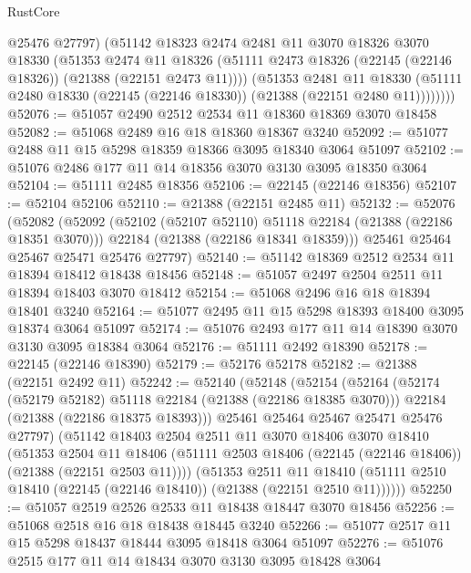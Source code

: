 \begin{lexlean}{RustCore}
\begin{coremodule}
            @25476
            @27797)
          (@51142
            @18323
            @2474
            @2481
            @11
            @3070
            @18326
            @3070
            @18330
            (@51353
              @2474
              @11
              @18326
              (@51111 @2473 @18326 (@22145 (@22146 @18326)) (@21388 (@22151 @2473 @11))))
            (@51353
              @2481
              @11
              @18330
              (@51111 @2480 @18330 (@22145 (@22146 @18330)) (@21388 (@22151 @2480 @11))))))))
@52076 := @51057 @2490 @2512 @2534 @11 @18360 @18369 @3070 @18458
@52082 := @51068 @2489 @16 @18 @18360 @18367 @3240
@52092 := @51077 @2488 @11 @15 @5298 @18359 @18366 @3095 @18340 @3064 @51097
@52102 := @51076 @2486 @177 @11 @14 @18356 @3070 @3130 @3095 @18350 @3064
@52104 := @51111 @2485 @18356
@52106 := @22145 (@22146 @18356)
@52107 := @52104 @52106
@52110 := @21388 (@22151 @2485 @11)
@52132 := @52076
    (@52082
      (@52092
        (@52102 (@52107 @52110) @51118 @22184 (@21388 (@22186 @18351 @3070)))
        @22184
        (@21388 (@22186 @18341 @18359)))
      @25461
      @25464
      @25467
      @25471
      @25476
      @27797)
@52140 := @51142 @18369 @2512 @2534 @11 @18394 @18412 @18438 @18456
@52148 := @51057 @2497 @2504 @2511 @11 @18394 @18403 @3070 @18412
@52154 := @51068 @2496 @16 @18 @18394 @18401 @3240
@52164 := @51077 @2495 @11 @15 @5298 @18393 @18400 @3095 @18374 @3064 @51097
@52174 := @51076 @2493 @177 @11 @14 @18390 @3070 @3130 @3095 @18384 @3064
@52176 := @51111 @2492 @18390
@52178 := @22145 (@22146 @18390)
@52179 := @52176 @52178
@52182 := @21388 (@22151 @2492 @11)
@52242 := @52140
    (@52148
      (@52154
        (@52164
          (@52174 (@52179 @52182) @51118 @22184 (@21388 (@22186 @18385 @3070)))
          @22184
          (@21388 (@22186 @18375 @18393)))
        @25461
        @25464
        @25467
        @25471
        @25476
        @27797)
      (@51142
        @18403
        @2504
        @2511
        @11
        @3070
        @18406
        @3070
        @18410
        (@51353
          @2504
          @11
          @18406
          (@51111 @2503 @18406 (@22145 (@22146 @18406)) (@21388 (@22151 @2503 @11))))
        (@51353
          @2511
          @11
          @18410
          (@51111 @2510 @18410 (@22145 (@22146 @18410)) (@21388 (@22151 @2510 @11))))))
@52250 := @51057 @2519 @2526 @2533 @11 @18438 @18447 @3070 @18456
@52256 := @51068 @2518 @16 @18 @18438 @18445 @3240
@52266 := @51077 @2517 @11 @15 @5298 @18437 @18444 @3095 @18418 @3064 @51097
@52276 := @51076 @2515 @177 @11 @14 @18434 @3070 @3130 @3095 @18428 @3064

\end{coremodule}
\end{lexlean}
